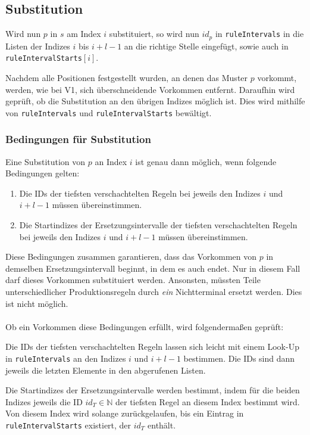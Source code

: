 \subsection{Substitution}
Wird nun $p$ in $s$ am Index $i$ substituiert, so wird nun $id_p$ in \texttt{ruleIntervals} in die Listen der Indizes $i$ bis $i + l - 1$ an die richtige Stelle eingefügt, sowie auch in \texttt{ruleIntervalStarts}$[i]$.

Nachdem alle Positionen festgestellt wurden, an denen das Muster $p$ vorkommt, werden, wie bei V1, sich überschneidende Vorkommen entfernt. Daraufhin wird geprüft, ob die Substitution an den übrigen Indizes möglich ist. Dies wird mithilfe von \texttt{ruleIntervals} und \texttt{ruleIntervalStarts} bewältigt.

\subsubsection{Bedingungen für Substitution} Eine Substitution von $p$ an Index $i$ ist genau dann möglich, wenn folgende Bedingungen gelten:

\begin{enumerate}
	\item Die IDs der tiefsten verschachtelten Regeln bei jeweils den Indizes $i$ und $i + l - 1$ müssen übereinstimmen.
	\item Die Startindizes der Ersetzungsintervalle der tiefsten verschachtelten Regeln bei jeweils den Indizes $i$ und $i + l - 1$ müssen übereinstimmen. 
\end{enumerate}

Diese Bedingungen zusammen garantieren, dass das Vorkommen von $p$ in demselben Ersetzungsintervall beginnt, in dem es auch endet. Nur in diesem Fall darf dieses Vorkommen substituiert werden. Ansonsten, müssten Teile unterschiedlicher Produktionsregeln durch \textit{ein} Nichtterminal ersetzt werden. Dies ist nicht möglich.\\\\
Ob ein Vorkommen diese Bedingungen erfüllt, wird folgendermaßen geprüft:

Die IDs der tiefsten verschachtelten Regeln lassen sich leicht mit einem Look-Up in \texttt{ruleIntervals} an den Indizes $i$ und $i + l - 1$ bestimmen. Die IDs sind dann jeweils die letzten Elemente in den abgerufenen Listen.

Die Startindizes der Ersetzungsintervalle werden bestimmt, indem für die beiden Indizes jeweils die ID $id_T \in \mathbb{N}$ der tiefsten Regel an diesem Index bestimmt wird. Von diesem Index wird solange zurückgelaufen, bis ein Eintrag in \texttt{ruleIntervalStarts} existiert, der $id_T$ enthält.

